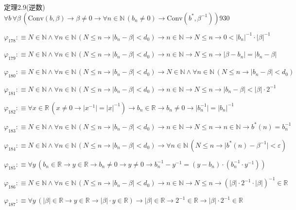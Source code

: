 \begin{fullproof}{定理2.9(逆数)}{$\forall b\,\forall \beta\,(\mathrm{Conv}(b,\beta) \to \beta \neq 0 \to \forall n \in \mathbb{N}\,(b_{n} \neq 0) \to \mathrm{Conv}(b^{\ast},\beta^{-1}))$}{930}
\begin{abbrevlist}
\item $\varphi_{178} :\equiv N \in \mathbb{N} \land \forall n \in \mathbb{N}\,(N \leq n \to \lvert b_{n} - \beta \rvert < d_{0}) \to n \in \mathbb{N} \to N \leq n \to 0 < \lvert b_{n} \rvert^{-1} \cdot \lvert \beta \rvert^{-1}$
\item $\varphi_{179} :\equiv N \in \mathbb{N} \land \forall n \in \mathbb{N}\,(N \leq n \to \lvert b_{n} - \beta \rvert < d_{0}) \to n \in \mathbb{N} \to N \leq n \to \lvert \beta - b_{n} \rvert = \lvert b_{n} - \beta \rvert$
\item $\varphi_{180} :\equiv N \in \mathbb{N} \land \forall n \in \mathbb{N}\,(N \leq n \to \lvert b_{n} - \beta \rvert < d_{0}) \to N \in \mathbb{N} \land \forall n \in \mathbb{N}\,(N \leq n \to \lvert b_{n} - \beta \rvert < d_{0})$
\item $\varphi_{181} :\equiv N \in \mathbb{N} \land \forall n \in \mathbb{N}\,(N \leq n \to \lvert b_{n} - \beta \rvert < d_{0}) \to n \in \mathbb{N} \to N \leq n \to \lvert b_{n} - \beta \rvert < \lvert \beta \rvert \cdot 2^{-1}$
\item $\varphi_{182} :\equiv \forall x \in \mathbb{R}\,(x \neq 0 \to \lvert x^{-1} \rvert = \lvert x \rvert^{-1}) \to b_{n} \in \mathbb{R} \to b_{n} \neq 0 \to \lvert b_{n}^{-1} \rvert = \lvert b_{n} \rvert^{-1}$
\item $\varphi_{183} :\equiv N \in \mathbb{N} \land \forall n \in \mathbb{N}\,(N \leq n \to \lvert b_{n} - \beta \rvert < d_{0}) \to n \in \mathbb{N} \to N \leq n \to n \in \mathbb{N} \to b^{\ast}(n) = b_{n}^{-1}$
\item $\varphi_{184} :\equiv N \in \mathbb{N} \land \forall n \in \mathbb{N}\,(N \leq n \to \lvert b_{n} - \beta \rvert < d_{0}) \to \forall n \in \mathbb{N}\,(N \leq n \to \lvert b^{\ast}(n) - \beta^{-1} \rvert < \varepsilon)$
\item $\varphi_{185} :\equiv \forall y\,(b_{n} \in \mathbb{R} \to y \in \mathbb{R} \to b_{n} \neq 0 \to y \neq 0 \to b_{n}^{-1} - y^{-1} = (y - b_{n}) \cdot (b_{n}^{-1} \cdot y^{-1}))$
\item $\varphi_{186} :\equiv N \in \mathbb{N} \land \forall n \in \mathbb{N}\,(N \leq n \to \lvert b_{n} - \beta \rvert < d_{0}) \to n \in \mathbb{N} \to N \leq n \to (\lvert \beta \rvert \cdot 2^{-1} \cdot \lvert \beta \rvert)^{-1} \in \mathbb{R}$
\item $\varphi_{187} :\equiv \forall y\,(\lvert \beta \rvert \in \mathbb{R} \to y \in \mathbb{R} \to \lvert \beta \rvert \cdot y \in \mathbb{R}) \to \lvert \beta \rvert \in \mathbb{R} \to 2^{-1} \in \mathbb{R} \to \lvert \beta \rvert \cdot 2^{-1} \in \mathbb{R}$

\end{abbrevlist}
\end{fullproof}
